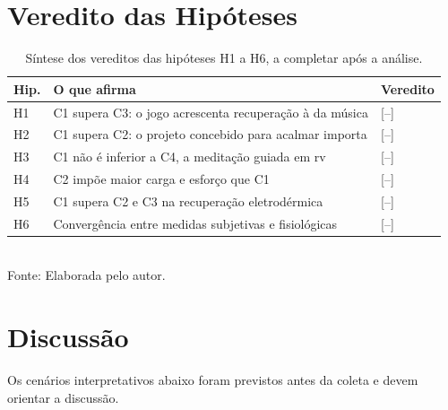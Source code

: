 \section{Veredito das Hipóteses}\label{sec:res-vereditos}


\begin{table}[H]
    \centering
    \caption{Síntese dos vereditos das hipóteses H1 a H6, a completar após a análise.}
    \label{tab:res-vereditos}
    \small
    \begin{tabularx}{\textwidth}{p{1.0cm}Xp{3.0cm}}
        \toprule
        \textbf{Hip.} & \textbf{O que afirma} & \textbf{Veredito} \\
        \midrule
        H1 & C1 supera C3: o jogo acrescenta recuperação à da música & [--] \\
        H2 & C1 supera C2: o projeto concebido para acalmar importa & [--] \\
        H3 & C1 não é inferior a C4, a meditação guiada em \gls{rv} & [--] \\
        H4 & C2 impõe maior carga e esforço que C1 & [--] \\
        H5 & C1 supera C2 e C3 na recuperação eletrodérmica & [--] \\
        H6 & Convergência entre medidas subjetivas e fisiológicas & [--] \\
        \bottomrule
    \end{tabularx}\\[2pt]
    {\footnotesize Fonte: Elaborada pelo autor.}
\end{table}

\section{Discussão}\label{sec:discussao}


Os cenários interpretativos abaixo foram previstos antes da coleta e devem orientar a discussão.

